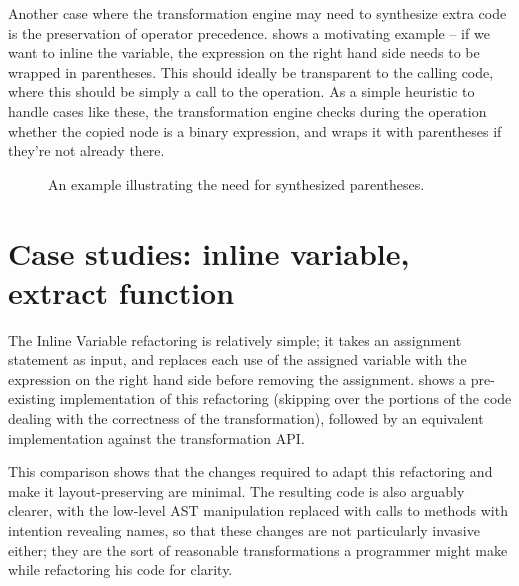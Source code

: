 Another case where the transformation engine may need to synthesize extra code
is the preservation of operator precedence.  shows
a motivating example -- if we want to inline the  variable, the
expression on the right hand side needs to be wrapped in parentheses. This
should ideally be transparent to the calling code, where this should be simply
a call to the  operation. As a simple heuristic to handle cases
like these, the transformation engine checks during the  operation
whether the copied node is a binary expression, and wraps it with parentheses
if they're not already there.

\begin{figure}
\begin{minipage}{0.5\linewidth}

\end{minipage}
\hfill \hspace{.3cm} \hfill
\begin{minipage}{0.5\linewidth}

\end{minipage}
\caption{An example illustrating the need for synthesized parentheses.}
\label{Fig:NeedParens}
\end{figure}

\section{Case studies: inline variable, extract function}

The Inline Variable refactoring is relatively simple; it takes an assignment
statement as input, and replaces each use of the assigned variable with the
expression on the right hand side before removing the assignment.
 shows a pre-existing implementation of this
refactoring (skipping over the portions of the code dealing with the
correctness of the transformation), followed by an equivalent implementation against
the transformation API.

This comparison shows that the changes required to adapt this refactoring and
make it layout-preserving are minimal. The resulting code is also arguably
clearer, with the low-level AST manipulation replaced with calls to methods
with intention revealing names, so that these changes are not particularly
invasive either; they are the sort of reasonable transformations a programmer
might make while refactoring his code for clarity.

